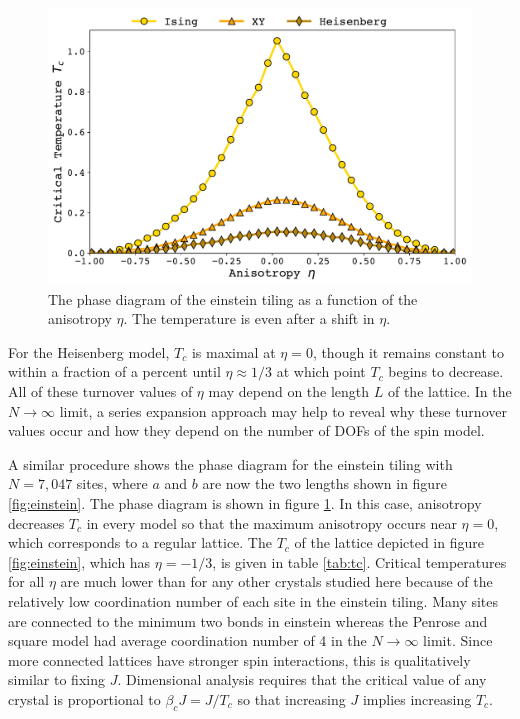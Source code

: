 \documentclass[
  amsmath,
  amssymb,
  aps,
  twocolumn,
  nofootinbib,
  nolongbibliography,
  floatfix,
]{revtex4-2}
\begin{document}
\begin{figure}
  \centering
  \includegraphics[width=\linewidth]{../figs/einstein-phase.pdf}
  \caption{The phase diagram of the einstein tiling as a function of the anisotropy $\eta$. The temperature is even after a shift in $\eta$.}
  \label{fig:einstein-phase}
\end{figure}

For the Heisenberg model, $T_c$ is maximal at $\eta=0$, though it remains constant to within a fraction of a percent until $\eta \approx 1/3$ at which point $T_c$ begins to decrease. All of these turnover values of $\eta$ may depend on the length $L$ of the lattice. In the $N\rightarrow \infty$ limit, a series expansion approach may help to reveal why these turnover values occur and how they depend on the number of DOFs of the spin model.

A similar procedure shows the phase diagram for the einstein tiling with $N=7,047$ sites, where $a$ and $b$ are now the two lengths shown in figure \ref{fig:einstein}. The phase diagram is shown in figure \ref{fig:einstein-phase}. In this case, anisotropy decreases $T_c$ in every model so that the maximum anisotropy occurs near $\eta = 0$, which corresponds to a regular lattice. The $T_c$ of the lattice depicted in figure \ref{fig:einstein}, which has $\eta = -1/3$, is given in table \ref{tab:tc}. Critical temperatures for all $\eta$ are much lower than for any other crystals studied here because of the relatively low coordination number of each site in the einstein tiling. Many sites are connected to the minimum two bonds in einstein whereas the Penrose and square model had average coordination number of 4 in the $N\rightarrow \infty$ limit. Since more connected lattices have stronger spin interactions, this is qualitatively similar to fixing $J$. Dimensional analysis requires that the critical value of any crystal is proportional to $\beta_c J = J/T_c$ so that increasing $J$ implies increasing $T_c$.
\end{document}
